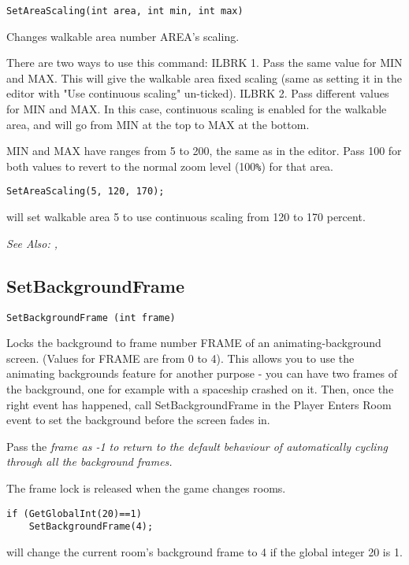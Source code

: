 \begin{verbatim}
SetAreaScaling(int area, int min, int max)
\end{verbatim}
Changes walkable area number AREA's scaling.

There are two ways to use this command: ILBRK
1. Pass the same value for MIN and MAX. This will give the walkable area fixed
scaling (same as setting it in the editor with "Use continuous scaling" un-ticked). ILBRK
2. Pass different values for MIN and MAX. In this case, continuous scaling is
enabled for the walkable area, and will go from MIN at the top to MAX at the bottom.

MIN and MAX have ranges from 5 to 200, the same as in the editor. Pass 100 for both values
to revert to the normal zoom level (100\verb$%$) for that area.

\begin{verbatim}
SetAreaScaling(5, 120, 170);
\end{verbatim}
will set walkable area 5 to use continuous scaling from 120 to 170 percent.

\it{See Also:} , 


\subsection{SetBackgroundFrame}\label{SetBackgroundFrame}%

\begin{verbatim}
SetBackgroundFrame (int frame)
\end{verbatim}
Locks the background to frame number FRAME of an animating-background
screen. (Values for FRAME are from 0 to 4). This allows you to use the
animating backgrounds feature for another purpose - you can have two
frames of the background, one for example with a spaceship crashed on it.
Then, once the right event has happened, call SetBackgroundFrame in the
Player Enters Room event to set the background before the screen fades in.

Pass the \it{frame} as -1 to return to the default behaviour of automatically
cycling through all the background frames.

The frame lock is released when the game changes rooms.

\begin{verbatim}
if (GetGlobalInt(20)==1)
    SetBackgroundFrame(4);
\end{verbatim}
will change the current room's background frame to 4 if the global integer 20 is 1.

